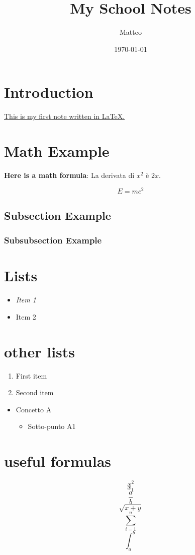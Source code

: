 \documentclass[12pt]{article}
\title{My School Notes}
\author{Matteo}
\date{\today}
\begin{document}
\maketitle

\section{Introduction}
\underline {This is my first note written in LaTeX.}

\section{Math Example}
\textbf {Here is a math formula}:
La derivata di $x^2$ è $2x$.

\[
E = mc^2
\]

\subsection{Subsection Example
}
\subsubsection{Subsubsection Example}



\section{Lists}
\begin{itemize}
    \item \textit {Item 1}
    \item Item 2
\end{itemize}

\section{other lists}
\begin{enumerate}
    \item First item
    \item Second item
\end{enumerate}

\begin{itemize} 
    \item Concetto A
    \begin{itemize}
        \item Sotto-punto A1
    \end{itemize}
\end{itemize}

\section{useful formulas}
\[
x^2
\]
\[x_1\]
\[
\frac{a}{b}\]
\[
\sqrt{x+y}
\]
\[
\sum_{i=1}^n
\]
\[
\int_a^b
\]
\end{document}

